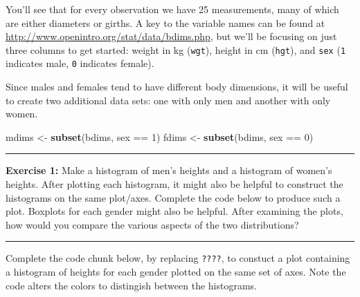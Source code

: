 \documentclass[]{book}
\newenvironment{Shaded}{\begin{snugshade}}{\end{snugshade}}
\newcommand{\KeywordTok}[1]{\textcolor[rgb]{0.13,0.29,0.53}{\textbf{{#1}}}}
\newcommand{\DecValTok}[1]{\textcolor[rgb]{0.00,0.00,0.81}{{#1}}}
\newcommand{\StringTok}[1]{\textcolor[rgb]{0.31,0.60,0.02}{{#1}}}
\newcommand{\NormalTok}[1]{{#1}}
\theoremstyle{definition}
\theoremstyle{definition}
\theoremstyle{definition}
\theoremstyle{remark}
\begin{document}
You'll see that for every observation we have 25 measurements, many of
which are either diameters or girths. A key to the variable names can be
found at \url{http://www.openintro.org/stat/data/bdims.php}, but we'll
be focusing on just three columns to get started: weight in kg
(\texttt{wgt}), height in cm (\texttt{hgt}), and \texttt{sex}
(\texttt{1} indicates male, \texttt{0} indicates female).

Since males and females tend to have different body dimensions, it will
be useful to create two additional data sets: one with only men and
another with only women.

\begin{Shaded}
\begin{Highlighting}[]
\NormalTok{mdims <-}\StringTok{ }\KeywordTok{subset}\NormalTok{(bdims, sex ==}\StringTok{ }\DecValTok{1}\NormalTok{)}
\NormalTok{fdims <-}\StringTok{ }\KeywordTok{subset}\NormalTok{(bdims, sex ==}\StringTok{ }\DecValTok{0}\NormalTok{)}
\end{Highlighting}
\end{Shaded}

\begin{center}\rule{0.5\linewidth}{\linethickness}\end{center}

\textbf{Exercise 1:} Make a histogram of men's heights and a histogram
of women's heights. After plotting each histogram, it might also be
helpful to construct the histograms on the same plot/axes. Complete the
code below to produce such a plot. Boxplots for each gender might also
be helpful. After examining the plots, how would you compare the various
aspects of the two distributions?

\begin{center}\rule{0.5\linewidth}{\linethickness}\end{center}

Complete the code chunk below, by replacing \texttt{????}, to constuct a
plot containing a histogram of heights for each gender plotted on the
same set of axes. Note the code alters the colors to distingish between
the histograms.
\end{document}
